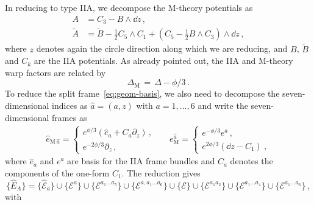 \documentclass[debug]{phd}
\begin{document}
				In reducing to type IIA, we decompose the M-theory potentials as 
						\begin{align}
							A &= C_3 - B \wedge \dd z\, , \\
							\tilde{A} &= \tilde{B} - \tfrac{1}{2}C_5 \wedge C_1 + (C_5 - \tfrac{1}{2}B \wedge C_3) \wedge \dd z\, , 
						\end{align}
				where $z$ denotes again the circle direction along which we are reducing, and $B$, $\tilde{B}$ and $C_k$ are the IIA potentials. 
				As already pointed out, the IIA and M-theory warp factors are related by
						\begin{equation}
							\Delta_{\mathrm{M}} \,=\, \Delta - \phi/3 \ . 
						\end{equation}
				To reduce the split frame~\eqref{eq:geom-basis}, we also need to decompose the seven-dimensional indices as $\hat{a} = (a, z)$ with $a=1, \ldots, 6$ and write the seven-dimensional frames as 
					\begin{align}
								\hat{e}_{{\mathrm{M}}\ \hat{a}} = 	\begin{cases} 
																e^{\phi/3}\left(\hat{e}_a + C_a \partial_z\right) \, , \\
 																e^{-2\phi/3}\partial_z \, ,
															\end{cases}
							& &
								e_{\mathrm{M}}^{\hat{a}} =		\begin{cases} 
																e^{-\phi/3}e^a \, ,\\
																e^{2\phi/3}\left(\dd z - C_1\right)\ ,
															\end{cases}
						\end{align}
				where $\hat{e}_a$ and $e^a$ are basis for the IIA frame bundles and $C_a$ denotes the components of the one-form $C_1$. 
				The reduction gives
						\begin{equation*}
							\{ \hat{E}_A \} = \{ \hat{\mathcal{E}}_a \} \cup \{\mathcal{E}^a\} \cup \{ \mathcal{E}^{a_1 \ldots a_5} \} \cup \{ \mathcal{E}^{a,a_1\ldots a_6} \} \cup \{ \mathcal{E} \} \cup \{ \mathcal{E}^{a_1a_2} \} \cup \{ \mathcal{E}^{a_1\ldots a_4} \} \cup \{ \mathcal{E}^{a_1 \ldots a_6} \} \, ,
						\end{equation*} 
				with
\end{document}
